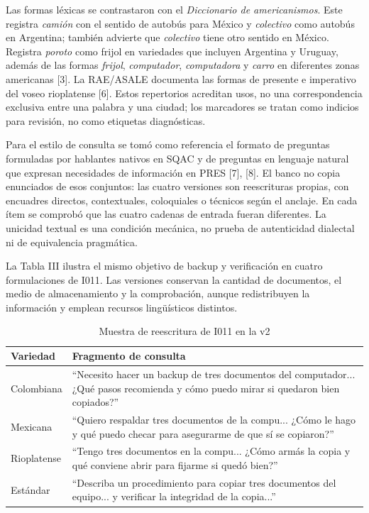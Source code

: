 \documentclass[conference]{IEEEtran}
\begin{document}
Las formas léxicas se contrastaron con el \emph{Diccionario de americanismos}. Este registra \textit{camión} con el sentido de autobús para México y \textit{colectivo} como autobús en Argentina; también advierte que \textit{colectivo} tiene otro sentido en México. Registra \textit{poroto} como frijol en variedades que incluyen Argentina y Uruguay, además de las formas \textit{frijol}, \textit{computador}, \textit{computadora} y \textit{carro} en diferentes zonas americanas [3]. La RAE/ASALE documenta las formas de presente e imperativo del voseo rioplatense [6]. Estos repertorios acreditan usos, no una correspondencia exclusiva entre una palabra y una ciudad; los marcadores se tratan como indicios para revisión, no como etiquetas diagnósticas.

Para el estilo de consulta se tomó como referencia el formato de preguntas formuladas por hablantes nativos en SQAC y de preguntas en lenguaje natural que expresan necesidades de información en PRES [7], [8]. El banco no copia enunciados de esos conjuntos: las cuatro versiones son reescrituras propias, con encuadres directos, contextuales, coloquiales o técnicos según el anclaje. En cada ítem se comprobó que las cuatro cadenas de entrada fueran diferentes. La unicidad textual es una condición mecánica, no prueba de autenticidad dialectal ni de equivalencia pragmática.

La Tabla III ilustra el mismo objetivo de backup y verificación en cuatro formulaciones de I011. Las versiones conservan la cantidad de documentos, el medio de almacenamiento y la comprobación, aunque redistribuyen la información y emplean recursos lingüísticos distintos.

\begin{table}[!ht]
\caption{Muestra de reescritura de I011 en la v2}
\centering
\scriptsize
\begin{tabularx}{\columnwidth}{p{}X}
\toprule
Variedad & Fragmento de consulta \\
\midrule
Colombiana & ``Necesito hacer un backup de tres documentos del computador... ¿Qué pasos recomienda y cómo puedo mirar si quedaron bien copiados?'' \\
Mexicana & ``Quiero respaldar tres documentos de la compu... ¿Cómo le hago y qué puedo checar para asegurarme de que sí se copiaron?'' \\
Rioplatense & ``Tengo tres documentos en la compu... ¿Cómo armás la copia y qué conviene abrir para fijarme si quedó bien?'' \\
Estándar & ``Describa un procedimiento para copiar tres documentos del equipo... y verificar la integridad de la copia...'' \\
\bottomrule
\end{tabularx}
\end{table}
\end{document}
